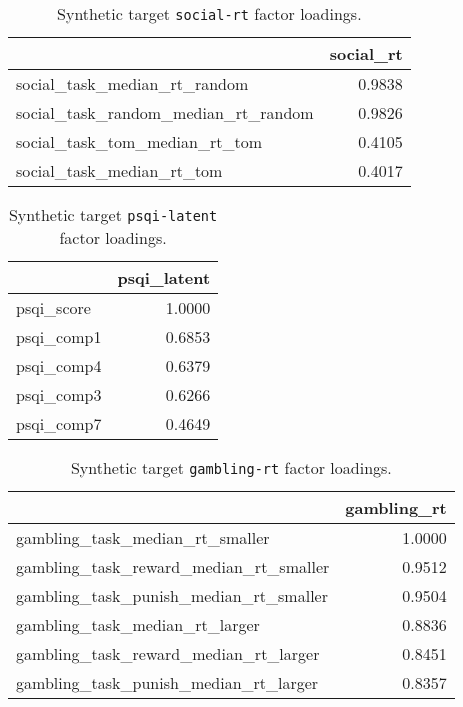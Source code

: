 \documentclass{article}
\begin{document}
\begin{table}
\centering
\begin{tabular}{lr}
\toprule
 & social\_rt \\
\midrule
social\_task\_median\_rt\_random & 0.9838 \\
social\_task\_random\_median\_rt\_random & 0.9826 \\
social\_task\_tom\_median\_rt\_tom & 0.4105 \\
social\_task\_median\_rt\_tom & 0.4017 \\
\bottomrule
\end{tabular}

\footnotesize
\caption{Synthetic target \texttt{social-rt} factor loadings.}
\normalsize
\label{tab:social-rt}
\end{table}


\begin{table}
\centering
\begin{tabular}{lr}
\toprule
 & psqi\_latent \\
\midrule
psqi\_score & 1.0000 \\
psqi\_comp1 & 0.6853 \\
psqi\_comp4 & 0.6379 \\
psqi\_comp3 & 0.6266 \\
psqi\_comp7 & 0.4649 \\
\bottomrule
\end{tabular}

\footnotesize
\caption{Synthetic target \texttt{psqi-latent} factor loadings.}
\normalsize
\label{tab:psqi-latent}
\end{table}


\begin{table}
\centering
\begin{tabular}{lr}
\toprule
 & gambling\_rt \\
\midrule
gambling\_task\_median\_rt\_smaller & 1.0000 \\
gambling\_task\_reward\_median\_rt\_smaller & 0.9512 \\
gambling\_task\_punish\_median\_rt\_smaller & 0.9504 \\
gambling\_task\_median\_rt\_larger & 0.8836 \\
gambling\_task\_reward\_median\_rt\_larger & 0.8451 \\
gambling\_task\_punish\_median\_rt\_larger & 0.8357 \\
\bottomrule
\end{tabular}

\footnotesize
\caption{Synthetic target \texttt{gambling-rt} factor loadings.}
\normalsize
\label{tab:gambling-rt}
\end{table}
\end{document}
